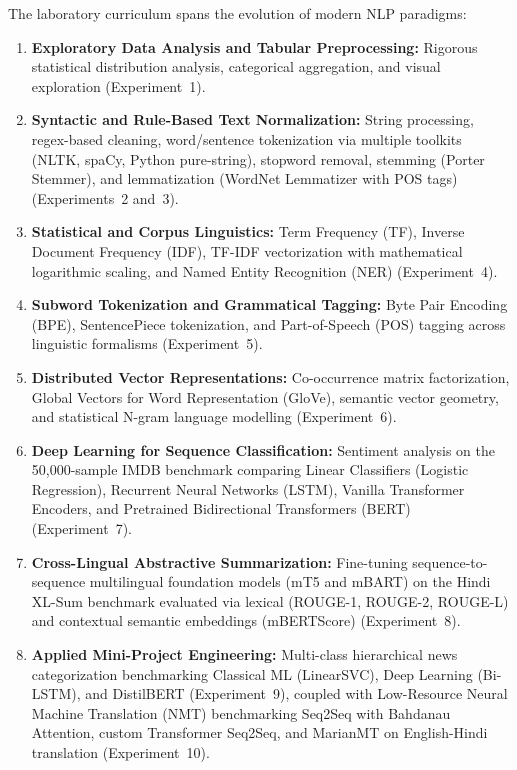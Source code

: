 \documentclass[12pt,a4paper]{report}
\begin{document}
The laboratory curriculum spans the evolution of modern NLP paradigms:
\begin{enumerate}[label=\textbf{\arabic*.}]
    \item \textbf{Exploratory Data Analysis and Tabular Preprocessing:} Rigorous statistical distribution analysis, categorical aggregation, and visual exploration (Experiment~1).
    \item \textbf{Syntactic and Rule-Based Text Normalization:} String processing, regex-based cleaning, word/sentence tokenization via multiple toolkits (NLTK, spaCy, Python pure-string), stopword removal, stemming (Porter Stemmer), and lemmatization (WordNet Lemmatizer with POS tags) (Experiments~2 and~3).
    \item \textbf{Statistical and Corpus Linguistics:} Term Frequency (TF), Inverse Document Frequency (IDF), TF-IDF vectorization with mathematical logarithmic scaling, and Named Entity Recognition (NER) (Experiment~4).
    \item \textbf{Subword Tokenization and Grammatical Tagging:} Byte Pair Encoding (BPE), SentencePiece tokenization, and Part-of-Speech (POS) tagging across linguistic formalisms (Experiment~5).
    \item \textbf{Distributed Vector Representations:} Co-occurrence matrix factorization, Global Vectors for Word Representation (GloVe), semantic vector geometry, and statistical N-gram language modelling (Experiment~6).
    \item \textbf{Deep Learning for Sequence Classification:} Sentiment analysis on the 50,000-sample IMDB benchmark comparing Linear Classifiers (Logistic Regression), Recurrent Neural Networks (LSTM), Vanilla Transformer Encoders, and Pretrained Bidirectional Transformers (BERT) (Experiment~7).
    \item \textbf{Cross-Lingual Abstractive Summarization:} Fine-tuning sequence-to-sequence multilingual foundation models (mT5 and mBART) on the Hindi XL-Sum benchmark evaluated via lexical (ROUGE-1, ROUGE-2, ROUGE-L) and contextual semantic embeddings (mBERTScore) (Experiment~8).
    \item \textbf{Applied Mini-Project Engineering:} Multi-class hierarchical news categorization benchmarking Classical ML (LinearSVC), Deep Learning (Bi-LSTM), and DistilBERT (Experiment~9), coupled with Low-Resource Neural Machine Translation (NMT) benchmarking Seq2Seq with Bahdanau Attention, custom Transformer Seq2Seq, and MarianMT on English-Hindi translation (Experiment~10).
\end{enumerate}
\end{document}
